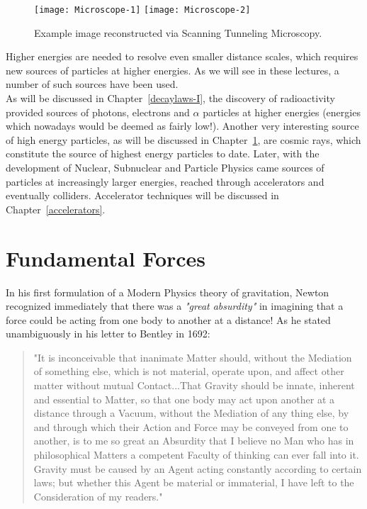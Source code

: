 \begin{figure}
  \centering
  \texttt{[image: Microscope-1]}
  \texttt{[image: Microscope-2]}
\caption{Example image reconstructed via Scanning Tunneling Microscopy.}  \label{fig:Microscope}
\end{figure}{}

 Higher energies are needed to resolve even smaller distance scales, which requires new sources of particles at higher energies. As we will see in these lectures, a number of such sources have been used.  \\
 
  As will be discussed in Chapter~\ref{decaylaws-I}, the discovery of radioactivity provided sources of photons, electrons and $\alpha$ particles at higher energies (energies which nowadays would be deemed as fairly low!). Another very interesting source of high energy particles, as will be discussed in Chapter~\ref{}, are cosmic rays, which constitute the source of highest energy particles to date. Later, with the development of Nuclear, Subnuclear and Particle Physics came sources of particles at increasingly larger energies, reached through accelerators and eventually colliders. Accelerator techniques will be discussed in Chapter~\ref{accelerators}.

\section{Fundamental Forces}

In his first formulation of a Modern Physics theory of gravitation, Newton recognized immediately that there was a {\it "great absurdity"} in imagining that a force could be acting from one body to another at a distance! As he stated unambiguously in his letter to Bentley in 1692: 

\begin{quote}
    "It is inconceivable that inanimate Matter should, without the Mediation of something else, which is not material, operate upon, and affect other matter without mutual Contact...That Gravity should be innate, inherent and essential to Matter, so that one body may act upon another at a distance through a Vacuum, without the Mediation of any thing else, by and through which their Action and Force may be conveyed from one to another, is to me so great an Absurdity that I believe no Man who has in philosophical Matters a competent Faculty of thinking can ever fall into it. Gravity must be caused by an Agent acting constantly according to certain laws; but whether this Agent be material or immaterial, I have left to the Consideration of my readers."
\end{quote}

